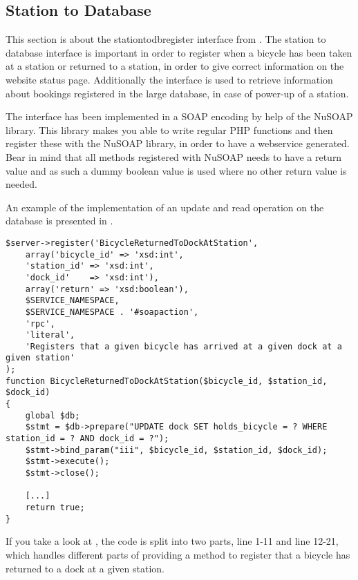 \subsection{Station to Database}
This section is about the stationtodbregister interface from .
The station to database interface is important in order to register when a bicycle has been taken at a station or returned to a station, in order to give correct information on the website status page.
Additionally the interface is used to retrieve information about bookings registered in the large database, in case of power-up of a station.

The interface has been implemented in a SOAP encoding by help of the NuSOAP library\citep{misc:nusoap}.
This library makes you able to write regular PHP functions and then register these with the NuSOAP library, in order to have a webservice generated.
Bear in mind that all methods registered with NuSOAP needs to have a return value and as such a dummy boolean value is used where no other return value is needed.

An example of the implementation of an update and read operation on the database is presented in .

\begin{minipage}{\textwidth}
\begin{lstlisting}[caption = {Method for registering a bicycle as been returned to a dock at a given station.}, label = {lst:bicycledockstationreturned}]
$server->register('BicycleReturnedToDockAtStation',
	array('bicycle_id' => 'xsd:int',
	'station_id' => 'xsd:int',
	'dock_id'    => 'xsd:int'),
	array('return' => 'xsd:boolean'),
	$SERVICE_NAMESPACE,
	$SERVICE_NAMESPACE . '#soapaction',
	'rpc',
	'literal',
	'Registers that a given bicycle has arrived at a given dock at a given station'
);
function BicycleReturnedToDockAtStation($bicycle_id, $station_id, $dock_id)
{
	global $db;
	$stmt = $db->prepare("UPDATE dock SET holds_bicycle = ? WHERE station_id = ? AND dock_id = ?");
	$stmt->bind_param("iii", $bicycle_id, $station_id, $dock_id);
	$stmt->execute();
	$stmt->close();
	
	[...]
	return true;
}
\end{lstlisting}
\end{minipage}

If you take a look at , the code is split into two parts, line 1-11 and line 12-21, which handles different parts of providing a method to register that a bicycle has returned to a dock at a given station.

